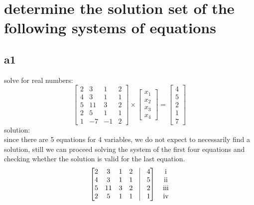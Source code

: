\documentclass[a4paper,10pt]{article}
\title{}
\author{}
\newcommand{\RN}[1]{%
  \textup{\uppercase\expandafter{\romannumeral#1}}%
}
\begin{document}
\maketitle



\section{determine the solution set of the following systems of equations}
\subsection*{a1}
solve for real numbers:
\[
\begin{bmatrix}
2 & 3  & 1  & 2 \\
4 & 3  & 1  & 1  \\
5 & 11 & 3  & 2  \\
2 & 5  & 1  & 1  \\
1 & -7 & -1 & 2  
\end{bmatrix}
\times
\begin{bmatrix}
 x_1\\x_2\\x_3\\x_4
\end{bmatrix}
=
\begin{bmatrix}
 4 \\ 5\\2 \\ 1 \\ 7
\end{bmatrix}
\]
solution:\\
since there are 5 equations for 4 variables, we do not expect to necessarily find a solution, still we can proceed solving the system of the first four equations and checking whether the solution is valid for the last equation.\\
\[
\begin{bmatrix}
2 & 3  & 1 & 2 & \vline & 4\\
4 & 3  & 1 & 1 & \vline & 5\\
5 & 11 & 3 & 2 & \vline & 2\\
2 & 5  & 1 & 1 & \vline & 1\\
\end{bmatrix}
\quad
\begin{matrix}
 \RN{1}\\ \RN{2}\\ \RN{3}\\ \RN{4}
\end{matrix}
\]
\end{document}
